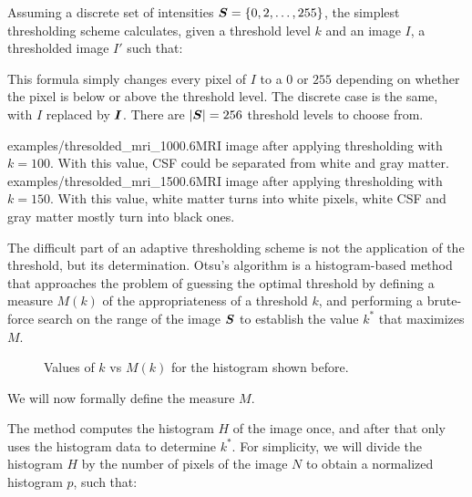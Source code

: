 \newcommand{\vz}{\sigma_0^2}
\newcommand{\vo}{\sigma_1^2}
\newcommand{\vt}{\sigma_T^2}


Assuming a discrete set of intensities $\boldsymbol{S}=\{0,2,\dots,255\}$, the simplest thresholding scheme calculates, given a threshold level $k$ and an image $I$, a thresholded image $I'$ such that:


This formula simply changes every pixel of $I$ to a $0$ or $255$ depending on whether the pixel is below or above the threshold level. The discrete case is the same, with $I$ replaced by $\boldsymbol{I}$. There are $|\boldsymbol{S}|=256$ threshold levels to choose from. 

{examples/thresolded_mri_100}{0.6}{MRI image after applying thresholding with $k=100$. With this value, CSF could be separated from white and gray matter.}
{examples/thresolded_mri_150}{0.6}{MRI image after applying thresholding with $k=150$. With this value, white matter turns into white pixels, white CSF and gray matter mostly turn into black ones.}

The difficult part of an adaptive thresholding scheme is not the application of the threshold, but its determination. Otsu's algorithm is a histogram-based method that approaches the problem of guessing the optimal threshold by defining a measure $M(k)$ of the appropriateness of a threshold $k$, and performing a brute-force search on the range of the image $\boldsymbol{S}$ to establish the value $k^*$ that maximizes $M$.

\begin{figure}[H]
\centering
{}
\caption{Values of $k$ vs $M(k)$ for the histogram shown before.}
\end{figure}

We will now formally define the measure $M$. 

The method computes the histogram $H$ of the image once, and after that only uses the histogram data to determine $k^*$. For simplicity, we will divide the histogram $H$ by the number of pixels of the image $N$ to obtain a normalized histogram $p$, such that:

